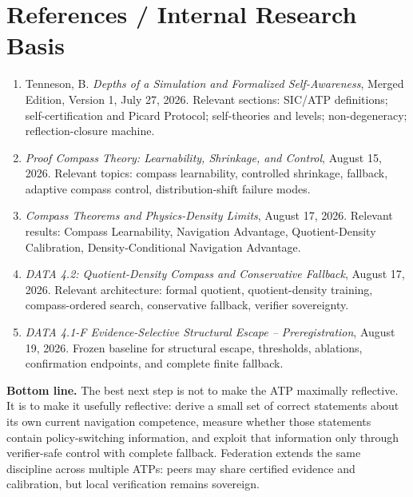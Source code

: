 \documentclass[11pt]{article}
\begin{document}
\section{References / Internal Research Basis}
\begin{enumerate}
\item Tenneson, B. \emph{Depths of a Simulation and Formalized Self-Awareness}, Merged Edition, Version 1, July 27, 2026. Relevant sections: SIC/ATP definitions; self-certification and Picard Protocol; self-theories and levels; non-degeneracy; reflection-closure machine.
\item \emph{Proof Compass Theory: Learnability, Shrinkage, and Control}, August 15, 2026. Relevant topics: compass learnability, controlled shrinkage, fallback, adaptive compass control, distribution-shift failure modes.
\item \emph{Compass Theorems and Physics-Density Limits}, August 17, 2026. Relevant results: Compass Learnability, Navigation Advantage, Quotient-Density Calibration, Density-Conditional Navigation Advantage.
\item \emph{DATA 4.2: Quotient-Density Compass and Conservative Fallback}, August 17, 2026. Relevant architecture: formal quotient, quotient-density training, compass-ordered search, conservative fallback, verifier sovereignty.
\item \emph{DATA 4.1-F Evidence-Selective Structural Escape -- Preregistration}, August 19, 2026. Frozen baseline for structural escape, thresholds, ablations, confirmation endpoints, and complete finite fallback.
\end{enumerate}

\begin{statusbox}
\textbf{Bottom line.} The best next step is not to make the ATP maximally reflective. It is to make it usefully reflective: derive a small set of correct statements about its own current navigation competence, measure whether those statements contain policy-switching information, and exploit that information only through verifier-safe control with complete fallback. Federation extends the same discipline across multiple ATPs: peers may share certified evidence and calibration, but local verification remains sovereign.
\end{statusbox}
\end{document}
